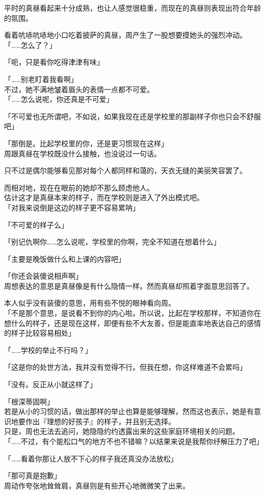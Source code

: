 平时的真昼看起来十分成熟，也让人感觉很稳重，而现在的真昼则表现出符合年龄的氛围。

看着吭哧吭哧地小口吃着披萨的真昼，周产生了一股想要摸她头的强烈冲动。\\

「……怎么了？」

「呃，只是看你吃得津津有味」

「……别老盯着我看啊」\\

不过，她不满地皱着眉头的表情一点都不可爱。\\

「……怎么说呢，你还真是不可爱」

「不可爱也无所谓吧，不如说，如果我现在还是学校里的那副样子你也只会不舒服吧」

「那倒是。比起学校里的你，还是更习惯现在这样」\\

周跟真昼在学校既没什么接触，也没说过一句话。

只不过是偶尔能够看见那对每个人都同样和蔼的，天衣无缝的美丽笑容罢了。

而相对地，现在在眼前的她却不那么顾虑他人。\\

估计这才是真昼本来的样子，而在学校则是进入了外出模式吧。\\

「对我来说倒是这边的样子更不容易累呐」%

「不可爱的样子么」

「别记仇啊你……怎么说呢，学校里的你啊，完全不知道在想着什么」

「主要是晚饭做什么和上课的内容吧」

「你还会装傻说相声啊」\\

周想表达的意思是真昼像是有什么隐情一样。然而真昼却照着字面意思回答了。

本人似乎没有装傻的意思，用有些不悦的眼神看向周。\\

「不是那个意思，是说看不到你的内心啦。所以说，比起在学校那样，不知道你在想什么的样子，还是现在这样，即便有些不大友善，但是能直率地表达自己的感情的样子比较容易相处」

「……学校的举止不行吗？」

「这是你的处世方法，我并没有觉得不行。但我在想，你这样难道不会累吗」

「没有。反正从小就这样了」

「根深蒂固啊」\\

若是从小的习惯的话，做出那样的举止也算是能够理解，然而这也表示，她是有意识地要作出『理想的好孩子』的样子，并且别无选择。\\%

只是，周也无法去追问，她隐隐约约透露出来的这些家庭环境相关的问题。\\

「……不过，有个能松口气的地方不也不错嘛？以结果来说是我帮你纾解压力了吧」

「……看着你那让人放不下心的样子我还真没办法放松」

「那可真是抱歉」\\

周动作夸张地耸耸肩，真昼则是有些开心地微微笑了出来。
